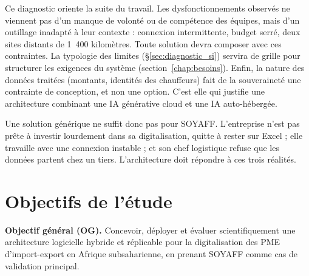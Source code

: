 Ce diagnostic oriente la suite du travail. Les dysfonctionnements observés ne viennent pas d'un manque de volonté ou de compétence des équipes, mais d'un outillage inadapté à leur contexte : connexion intermittente, budget serré, deux sites distants de 1~400 kilomètres. Toute solution devra composer avec ces contraintes. La typologie des limites (\S\ref{sec:diagnostic_si}) servira de grille pour structurer les exigences du système (section~\ref{chap:besoins}). Enfin, la nature des données traitées (montants, identités des chauffeurs) fait de la souveraineté une contrainte de conception, et non une option. C'est elle qui justifie une architecture combinant une IA générative cloud et une IA auto-hébergée.

Une solution générique ne suffit donc pas pour SOYAFF. L'entreprise n'est pas prête à investir lourdement dans sa digitalisation, quitte à rester sur Excel ; elle travaille avec une connexion instable ; et son chef logistique refuse que les données partent chez un tiers. L'architecture doit répondre à ces trois réalités.

\section{Objectifs de l'étude}
\label{sec:objectifs}

\textbf{Objectif général (OG).} Concevoir, déployer et évaluer scientifiquement une architecture logicielle hybride et réplicable pour la digitalisation des PME d'import-export en Afrique subsaharienne, en prenant SOYAFF comme cas de validation principal.

